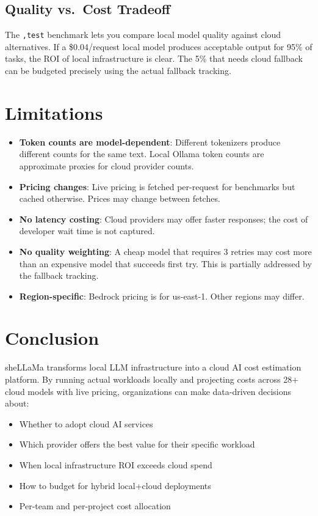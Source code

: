\documentclass[11pt,a4paper]{article}
\begin{document}
\subsection{Quality vs.\ Cost Tradeoff}

The \texttt{,test} benchmark lets you compare local model quality against cloud alternatives. If a \$0.04/request local model produces acceptable output for 95\% of tasks, the ROI of local infrastructure is clear. The 5\% that needs cloud fallback can be budgeted precisely using the actual fallback tracking.

\section{Limitations}

\begin{itemize}
  \item \textbf{Token counts are model-dependent}: Different tokenizers produce different counts for the same text. Local Ollama token counts are approximate proxies for cloud provider counts.
  \item \textbf{Pricing changes}: Live pricing is fetched per-request for benchmarks but cached otherwise. Prices may change between fetches.
  \item \textbf{No latency costing}: Cloud providers may offer faster responses; the cost of developer wait time is not captured.
  \item \textbf{No quality weighting}: A cheap model that requires 3 retries may cost more than an expensive model that succeeds first try. This is partially addressed by the fallback tracking.
  \item \textbf{Region-specific}: Bedrock pricing is for us-east-1. Other regions may differ.
\end{itemize}

\section{Conclusion}

sheLLaMa transforms local LLM infrastructure into a cloud AI cost estimation platform. By running actual workloads locally and projecting costs across 28+ cloud models with live pricing, organizations can make data-driven decisions about:

\begin{itemize}
  \item Whether to adopt cloud AI services
  \item Which provider offers the best value for their specific workload
  \item When local infrastructure ROI exceeds cloud spend
  \item How to budget for hybrid local+cloud deployments
  \item Per-team and per-project cost allocation
\end{itemize}
\end{document}
